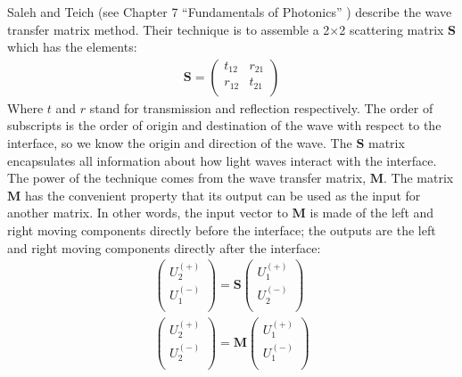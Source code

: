 \documentclass[osajnl,twocolumn,showpacs,superscriptaddress,11pt]{revtex4-1} %
\begin{document}
Saleh and Teich (see Chapter 7 ``Fundamentals of Photonics'' \cite{2007fuph.book.....S}) describe the wave transfer matrix method.  Their technique is to assemble a 2$\times$2 scattering matrix $\boldsymbol{S}$ which has the elements:
\begin{eqnarray}
\boldsymbol{S} = \left(
\begin{array}{cc}
 t_{12} & r_{21} \\
 r_{12} & t_{21} \\
\end{array}
\right)
\end{eqnarray}
Where $t$ and $r$ stand for transmission and reflection respectively.  The order of subscripts is the order of origin and destination of the wave with respect to the interface, so we know the origin and direction of the wave.  The $\boldsymbol{S}$ matrix encapsulates all information about how light waves interact with the interface.  The power of the technique comes from the wave transfer matrix, $\boldsymbol{M}$.  The matrix $\boldsymbol{M}$ has the convenient property that its output can be used as the input for another matrix.  In other words, the input vector to $\boldsymbol{M}$ is made of the left and right moving components directly before the interface; the outputs are the left and right moving components directly after the interface:
\begin{eqnarray}
\left(
\begin{array}{c}
 U_2^{(+)} \\
 U_1^{(-)} \\
\end{array}
\right)=\boldsymbol{S} \left(
\begin{array}{c}
 U_1^{(+)} \\
 U_2^{(-)} \\
\end{array}
\right) \\
\left(
\begin{array}{c}
 U_2^{(+)} \\
 U_2^{(-)} \\
\end{array}
\right)=\boldsymbol{M} \left(
\begin{array}{c}
 U_1^{(+)} \\
 U_1^{(-)} \\
\end{array}
\right)
\end{eqnarray}
\end{document}
